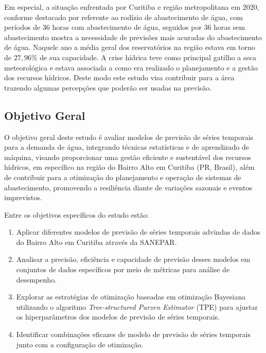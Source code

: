 Em especial, a situação enfrentada por Curitiba e região metropolitana em 2020, conforme destacado por \cite{vasconcelos_2020} referente ao rodízio de abastecimento de água, com períodos de 36 horas com abastecimento de água, seguidos por 36 horas sem abastecimento mostra a necessidade de previsões mais acuradas do abastecimento de água. Naquele ano a média geral dos reservatórios na região estava em torno de $27,96\%$ de sua capacidade. A crise hídrica teve como principal gatilho a seca meteorológica e estava associada a como era realizado o planejamento e a gestão dos recursos hídricos. Deste modo este estudo visa contribuir para a área trazendo algumas percepções que poderão ser usadas na previsão.

\subsection{Objetivo Geral} \label{subsec:objetivos}

O objetivo geral deste estudo é avaliar modelos de previsão de séries temporais para a demanda de água, integrando técnicas estatísticas e de aprendizado de máquina, visando proporcionar uma gestão eficiente e sustentável dos recursos hídricos, em específico na região do Bairro Alto em Curitiba (PR, Brasil), além de contribuir para a otimização do planejamento e operação de sistemas de abastecimento, promovendo a resiliência diante de variações sazonais e eventos imprevistos.

Entre os objetivos específicos do estudo estão:
\begin{enumerate}
	
	\item Aplicar diferentes modelos de previsão de séries temporais advindas de dados do Bairro Alto em Curitiba através da SANEPAR.
	
	\item Analisar a precisão, eficiência e capacidade de previsão desses modelos em conjuntos de dados específicos por meio de métricas para análise de desempenho.
	
	\item  Explorar as estratégias de otimização baseadas em otimização Bayesiana utilizando o algoritmo \textit{Tree-structured Parzen Estimator} (TPE) para ajustar os hiperparâmetros dos modelos de previsão de séries temporais.
	
	\item Identificar combinações eficazes de modelo de previsão de séries temporais junto com a configuração de otimização.
	
\end{enumerate}

